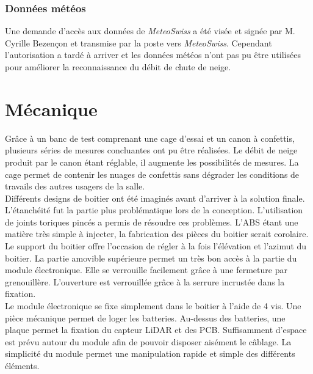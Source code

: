 \subsubsection{Données météos}
Une demande d'accès aux données de \emph{MeteoSwiss} a été visée et signée par M. Cyrille Bezençon et transmise
par la poste vers \emph{MeteoSwiss}. Cependant l'autorisation a tardé à arriver et les données météos
n'ont pas pu être utilisées pour améliorer la reconnaissance du débit de chute de neige.

\section{Mécanique}
Grâce à un banc de test comprenant une cage d’essai et un canon à confettis, plusieurs séries de mesures 
concluantes ont pu être réalisées. Le débit de neige produit par le canon étant réglable, il augmente les 
possibilités de mesures. La cage permet de contenir les nuages de confettis sans dégrader les conditions 
de travails des autres usagers de la salle.\\
Différents designs de boitier ont été imaginés avant d’arriver à la solution finale. L’étanchéité fut la 
partie plus problématique lors de la conception. L’utilisation de joints toriques pincés a permis de résoudre 
ces problèmes. L’ABS étant une matière très simple à injecter, la fabrication des pièces du boitier serait 
corolaire. Le support du boitier offre l'occasion de régler à la fois l’élévation et l’azimut du boitier. La partie 
amovible supérieure permet un très bon accès à la partie du module électronique. Elle se verrouille facilement 
grâce à une fermeture par grenouillère. L’ouverture est verrouillée grâce à la serrure incrustée dans la 
fixation.\\
Le module électronique se fixe simplement dans le boitier à l’aide de 4 vis. Une pièce mécanique permet 
de loger les batteries. Au-dessus des batteries, une plaque permet la fixation du capteur LiDAR 
et des PCB. Suffisamment d’espace est prévu autour du module afin de pouvoir disposer aisément le câblage. 
La simplicité du module permet une manipulation rapide et simple des différents éléments.